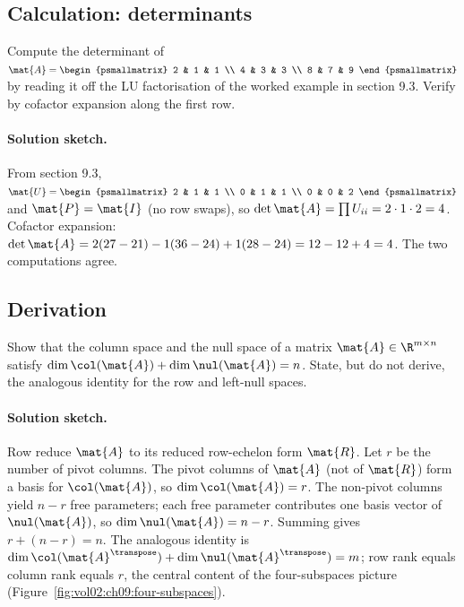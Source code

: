 \subsection*{Calculation: determinants}

\begin{exercise}
Compute the determinant of $\mat{A} = \begin{psmallmatrix} 2 & 1
& 1 \\ 4 & 3 & 3 \\ 8 & 7 & 9 \end{psmallmatrix}$ by reading it
off the LU factorisation of the worked example in section 9.3.
Verify by cofactor expansion along the first row.
\end{exercise}

\paragraph{Solution sketch.}
From section 9.3, $\mat{U} = \begin{psmallmatrix} 2 & 1 & 1 \\ 0 &
1 & 1 \\ 0 & 0 & 2 \end{psmallmatrix}$ and $\mat{P} = \mat{I}$
(no row swaps), so $\det \mat{A} = \prod U_{ii} = 2 \cdot 1 \cdot
2 = 4$. Cofactor expansion: $\det \mat{A} = 2 (27 - 21) - 1 (36 -
24) + 1 (28 - 24) = 12 - 12 + 4 = 4$. The two computations agree.

\subsection*{Derivation}

\begin{exercise}
Show that the column space and the null space of a matrix $\mat{A}
\in \R^{m \times n}$ satisfy $\dim \col(\mat{A}) + \dim \nul(\mat{A})
= n$. State, but do not derive, the analogous identity for the row
and left-null spaces.
\end{exercise}

\paragraph{Solution sketch.}
Row reduce $\mat{A}$ to its reduced row-echelon form $\mat{R}$.
Let $r$ be the number of pivot columns. The pivot columns of
$\mat{A}$ (not of $\mat{R}$) form a basis for $\col(\mat{A})$, so
$\dim \col(\mat{A}) = r$. The non-pivot columns yield $n - r$ free
parameters; each free parameter contributes one basis vector of
$\nul(\mat{A})$, so $\dim \nul(\mat{A}) = n - r$. Summing gives
$r + (n - r) = n$. The analogous identity is $\dim
\col(\mat{A}^{\transpose}) + \dim \nul(\mat{A}^{\transpose}) = m$;
row rank equals column rank equals $r$, the central content of the
four-subspaces picture (Figure~\ref{fig:vol02:ch09:four-subspaces}).

